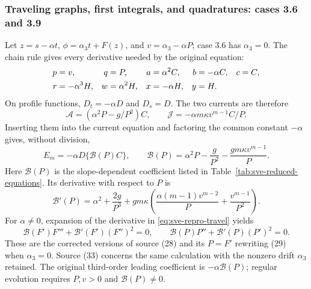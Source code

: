 \documentclass[11pt]{article}
\theoremstyle{definition}
\begin{document}
\subsubsection{Traveling graphs, first integrals, and quadratures: cases 3.6 and 3.9}

Let $z=s-\alpha t$, $\phi=\alpha_3t+F(z)$, and
$v=\alpha_3-\alpha P$; case 3.6 has $\alpha_3=0$.
The chain rule gives every derivative needed by the original equation:
\begin{align}
 p&=v,&q&=P,&a&=\alpha^2C,&b&=-\alpha C,&c&=C,\notag\\
 r&=-\alpha^3H,&w&=\alpha^2H,&x&=-\alpha H,&y&=H.
 \label{eq:sve-travel-jets}
\end{align}
On profile functions, $D_t=-\alpha D$ and $D_s=D$. The two currents
are therefore
\[
 \mathcal A=(\alpha^2P-g/P^2)C,\qquad
 \mathcal J=-\alpha m\kappa v^{m-1}C/P.
\]
Inserting them into the current equation and factoring the common
constant $-\alpha$ gives, without division,
\begin{equation}
 E_m=-\alpha D\{\mathcal B(P)C\},\qquad
 \mathcal B(P)=\alpha^2P-\frac g{P^2}-\frac{gm\kappa v^{m-1}}P.
 \label{eq:sve-repro-travel}
\end{equation}
Here $\mathcal B(P)$ is the slope-dependent coefficient listed in
Table~\ref{tab:sve-reduced-equations}. Its derivative with respect to $P$ is
\begin{equation}
 \mathcal B'(P)=\alpha^2+\frac{2g}{P^3}
    +gm\kappa\left(\frac{\alpha(m-1)v^{m-2}}P
                         +\frac{v^{m-1}}{P^2}\right).
 \label{eq:sve-travel-Bprime}
\end{equation}
For $\alpha\ne0$, expansion of the derivative in
\eqref{eq:sve-repro-travel} yields
\begin{equation}
 \mathcal B(F')F'''+\mathcal B'(F')(F'')^2=0,
 \qquad \mathcal B(P)P''+\mathcal B'(P)(P')^2=0.
 \label{eq:sve-travel-orders}
\end{equation}
These are the corrected versions of source (28) and its
$P=F'$ rewriting (29) when $\alpha_3=0$. Source (33) concerns the same
calculation with the nonzero drift $\alpha_3$ retained. The original
third-order leading coefficient is $-\alpha \mathcal B(P)$; regular evolution
requires $P,v>0$ and $\mathcal B(P)\ne0$.
\end{document}
